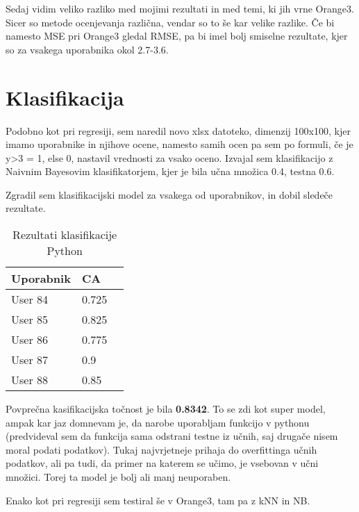 \documentclass[a4paper,11pt]{article}
\begin{document}
Sedaj vidim veliko razliko med mojimi rezultati in med temi, ki jih vrne Orange3. Sicer so metode ocenjevanja različna, vendar so to še kar velike razlike. Če bi namesto MSE pri Orange3 gledal RMSE, pa bi imel bolj smiselne rezultate, kjer so za vsakega uporabnika okol 2.7-3.6.

\section{Klasifikacija}

Podobno kot pri regresiji, sem naredil novo xlsx datoteko, dimenzij 100x100, kjer imamo uporabnike in njihove ocene, namesto samih ocen pa sem po formuli, če je y>3 = 1, else 0, nastavil vrednosti za vsako oceno. Izvajal sem klasifikacijo z Naivnim Bayesovim klasifikatorjem, kjer je bila učna množica 0.4, testna 0.6.

Zgradil sem klasifikacijski model za vsakega od uporabnikov, in dobil sledeče rezultate.

\begin{table}[htbp]
	\caption{Rezultati klasifikacije Python}
	\label{tab_py_klas}
	\begin{center}
		\begin{tabular}{llp{3cm}}
			
			\hline
			Uporabnik & CA \\
			\hline
			User 84 & 0.725 \\
			User 85 & 0.825 \\
			User 86 & 0.775 \\
			User 87 & 0.9 \\
			User 88 & 0.85 \\
			\hline
		\end{tabular}
	\end{center}
\end{table}

Povprečna kasifikacijska točnost je bila  \textbf{0.8342}. To se zdi kot super model, ampak kar jaz domnevam je, da narobe uporabljam funkcijo v pythonu (predvideval sem da funkcija sama odstrani testne iz učnih, saj drugače nisem moral podati podatkov). Tukaj najvrjetneje prihaja do overfittinga učnih podatkov, ali pa tudi, da primer na katerem se učimo, je vsebovan v učni množici. Torej ta model je bolj ali manj neuporaben.

Enako kot pri regresiji sem testiral še v Orange3, tam pa z kNN in NB.
\end{document}

